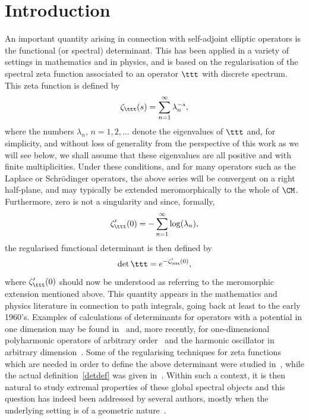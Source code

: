 \section*{Introduction}
An important quantity arising in connection with self-adjoint elliptic operators is the functional (or spectral)
determinant. This has been applied in a variety of settings in mathematics and in physics, and is based on the regularisation of the
spectral zeta function associated to an operator $\ttt$ with discrete spectrum. This zeta function is defined by
\begin{equation}\label{zetaT}
\zeta_{\ttt}(s) = \sum_{n=1}^{\infty} \lambda_{n}^{-s},
\end{equation}
where the numbers $\lambda_{n}, \, n=1,2,\ldots$ denote the eigenvalues of $\ttt$ and,
for simplicity, and without loss of generality from the perspective of this work as we will see below, we shall assume that these
eigenvalues are all positive and with finite multiplicities.
Under these conditions, and for many operators such as the Laplace or Schrödinger operators, the above series will be convergent
on a right half-plane, and may typically be extended meromorphically to the whole of $\CM$. Furthermore, zero
is not a singularity and since, formally,
\[
\zeta_{\ttt}'(0) = -\sum_{n=1}^{\infty} \log(\lambda_{n}),
\]
the regularised functional determinant is then defined by
\begin{equation}\label{detdef}
\det\ttt = e^{-\zeta_{\ttt}'(0)},
\end{equation}
where $\zeta_{\ttt}'(0)$ should now be understood as referring to the meromorphic extension mentioned above. This
quantity appears in the mathematics and physics literature in connection to path integrals, going back at least to the early 1960's. Examples
of calculations of determinants for operators with a potential in one dimension may be found in~\cite{BFK,geya,Levit-Smilansky} and, more recently,
for one-dimensional polyharmonic operators of arbitrary order~\cite{fl} and the harmonic oscillator in arbitrary dimension~\cite{frei}. Some
of the regularising techniques for zeta functions which are needed in order
to define the above determinant were studied in~\cite{mipl}, while the actual definition~\eqref{detdef} was given in~\cite{rasi}.
Within such a context, it is then natural to study extremal properties of these global spectral objects and this
question has indeed been addressed by several authors, mostly when the underlying setting is of a geometric nature~\cite{aursal,ops,okik,aar}.

